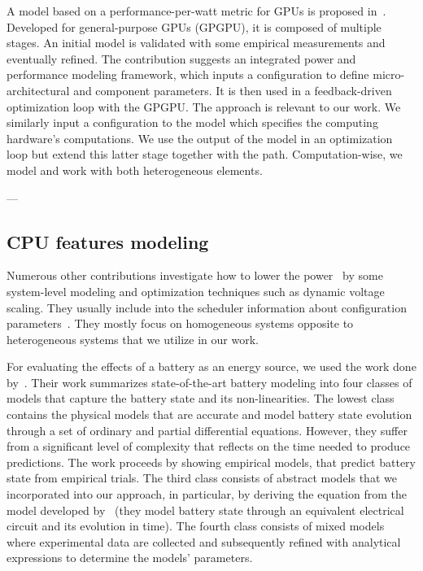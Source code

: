 A model based on a performance-per-watt metric for GPUs is proposed in~\citep{leng2013gpuwattch}. Developed for general-purpose GPUs (GPGPU), it is composed of multiple stages. An initial model is validated with some empirical measurements and eventually refined.  The contribution suggests an integrated power and performance modeling framework, which inputs a configuration to define micro-architectural and component parameters. It is then used in a feedback-driven optimization loop with the GPGPU. The approach is relevant to our work. We similarly input a configuration to the model which specifies the computing hardware's computations. We use the output of the model in an optimization loop but extend this latter stage together with the path. Computation-wise, we model and work with both heterogeneous elements.

---


\subsection{CPU features modeling}
\label{sec:soa-cpu}

Numerous other contributions investigate how to lower the power~\citep{hong1999power, luo2001battery, chowdhury2005static} by some system-level modeling and optimization techniques such as dynamic voltage scaling. They usually include into the scheduler information about configuration parameters~\citep{seewald2019coarse}. They mostly focus on homogeneous systems opposite to heterogeneous systems that we utilize in our work. 






 



For evaluating the effects of a battery as an energy source, we used the work done by~\citep{rao2003battery}. Their work summarizes state-of-the-art battery modeling into four classes of models that capture the battery state and its non-linearities. The lowest class contains the physical models that are accurate and model battery state evolution through a set of ordinary and partial differential equations. However, they suffer from a significant level of complexity that reflects on the time needed to produce predictions. The work proceeds by showing empirical models, that predict battery state from empirical trials. The third class consists of abstract models that we incorporated into our approach, in particular, by deriving the equation from the model developed by~\citep{hasan2018exogenous} (they model battery state through an equivalent electrical circuit and its evolution in time). The fourth class consists of mixed models where experimental data are collected and subsequently refined with analytical expressions to determine the models' parameters.


